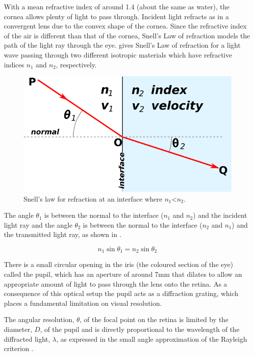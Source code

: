 With a mean refractive index of around 1.4 (about the same as water),
the cornea allows plenty of light to pass through. Incident light refracts
as in a convergent lens due to the convex shape of the cornea. Since
the refractive index of the air is different than that of the cornea, Snell's
Law of refraction models the path of the light ray through the
eye.  gives Snell's Law of refraction for a light wave
passing through two different isotropic materials which have refractive indices
$n_1$ and $n_2$, respectively.

\begin{figure}[H]
\centering
  \includegraphics{figures/snells}
\caption{Snell's law for refraction at an interface where
             $n_1$\textless $n_2$.\cite{wikisnell}}
\label{fig:snell}
\end{figure}

The angle $\theta_1$ is between the normal to the interface ($n_1$ and $n_2$)
and the incident light ray and the angle $\theta_2$ is between the normal to
the interface ($n_2$ and $n_1$) and the transmitted light ray, as shown in
.

\begin{equation}
n_1\sin\theta_1=n_2\sin\theta_2
\label{eq:refractive}
\end{equation}

There is a small circular opening in the iris (the coloured section of
the eye) called the pupil, which has an aperture of around 7mm that
dilates to allow an appropriate amount of light to pass through
the lens onto the retina.\cite{krugman1964some} As a consequence of
this optical setup the pupil acts as a diffraction grating, which places a 
fundamental limitation on visual resolution. 

The angular resolution, $\theta$, of the focal point on the retina is limited by
the diameter, $D$, of the pupil and is directly proportional to the wavelength
of the diffracted light, $\lambda$, as expressed in the small angle approximation
of the Rayleigh criterion .\cite{rayleigh1907dynamical}

